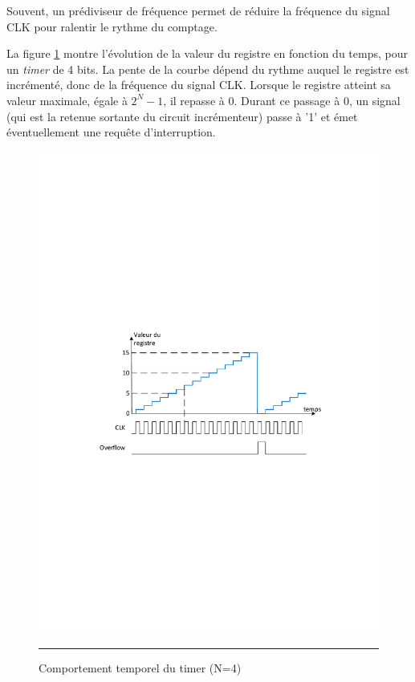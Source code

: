 Souvent, un prédiviseur de fréquence permet de réduire la fréquence du signal CLK pour ralentir le rythme du comptage.

La figure \ref{fig:ChronoSync} montre l'évolution de la valeur du registre en fonction du temps, pour un \textit{timer} de 4 bits. La pente de la courbe dépend du rythme auquel le registre est incrémenté, donc de la fréquence du signal CLK.
Lorsque le registre atteint sa valeur maximale, égale à $2^N-1$, il repasse à 0. Durant ce passage à 0, un signal (qui est la retenue sortante du circuit incrémenteur) passe à '1' et émet éventuellement une requête d'interruption.

\begin{figure}[htb]
  \centering
  \includegraphics[angle=0, width=14cm]{./Figures/Chap5_Timer/Timer_chrono1.pdf}
  \rule{35em}{0.5pt}
  \caption[Chrono timer]{Comportement temporel du timer (N=4)}
  \label{fig:ChronoSync}
\end{figure}

